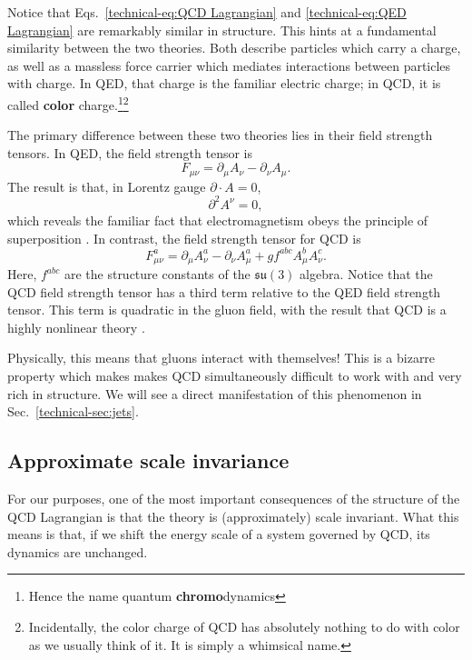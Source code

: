 \documentclass[../thesis.tex]{subfiles}
\providecommand{\su}{\mathfrak{su}}
\begin{document}
	Notice that Eqs.~\ref{technical-eq:QCD Lagrangian} and \ref{technical-eq:QED Lagrangian} are remarkably similar in structure. This hints at a fundamental similarity between the two theories. Both describe particles which carry a charge, as well as a massless force carrier which mediates interactions between particles with charge. In QED, that charge is the familiar electric charge; in QCD, it is called \textbf{color} charge.\footnote{Hence the name quantum \textbf{chromo}dynamics}\footnote{Incidentally, the color charge of QCD has absolutely nothing to do with color as we usually think of it. It is simply a whimsical name.}

	The primary difference between these two theories lies in their field strength tensors. In QED, the field strength tensor is \cite{larkoski_elementary_2019-1}
	\begin{equation}
		F_{\mu \nu} = \partial_\mu A_\nu - \partial_\nu A_\mu.
	\end{equation}
	The result is that, in Lorentz gauge $\partial \cdot A = 0$,
	\begin{equation}
		\partial^2 A^\nu = 0,
	\end{equation}
	which reveals the familiar fact that electromagnetism obeys the principle of superposition \cite{larkoski_elementary_2019-1}. In contrast, the field strength tensor for QCD is \cite{larkoski_elementary_2019-1}
	\begin{equation}\label{technical-eq:QCD field strength}
		F_{\mu \nu}^a = \partial_\mu A_\nu^a - \partial_\nu A_\mu^a + g f^{abc} A_\mu^b A_\nu^c.
	\end{equation}
	Here, $f^{abc}$ are the structure constants of the $\su(3)$ algebra. Notice that the QCD field strength tensor has a third term relative to the QED field strength tensor. This term is quadratic in the gluon field, with the result that QCD is a highly nonlinear theory \cite{larkoski_elementary_2019-1}. 

	Physically, this means that gluons interact with themselves! This is a bizarre property which makes makes QCD simultaneously difficult to work with and very rich in structure. We will see a direct manifestation of this phenomenon in Sec.~\ref{technical-sec:jets}.

\subsection{Approximate scale invariance}
	For our purposes, one of the most important consequences of the structure of the QCD Lagrangian is that the theory is (approximately) scale invariant. What this means is that, if we shift the energy scale of a system governed by QCD, its dynamics are unchanged. 
\end{document}
